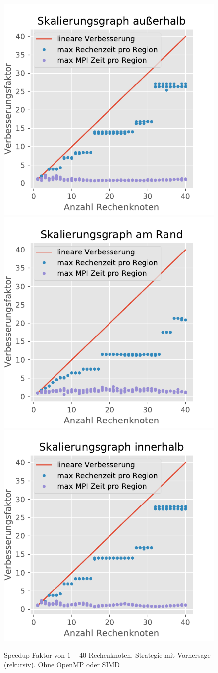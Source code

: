 \begin{figure}[h!]
	\centering
	\includegraphics[width=0.32\linewidth]{img/Evaluation/scale_graph_outside}
	\includegraphics[width=0.32\linewidth]{img/Evaluation/scale_graph_border}
	\includegraphics[width=0.32\linewidth]{img/Evaluation/scale_graph_inside}
	\caption{Speedup-Faktor von \( 1-40 \) Rechenknoten. Strategie mit Vorhersage (rekursiv). Ohne OpenMP oder SIMD}
	\label{fig:scaleGraph}
\end{figure}
